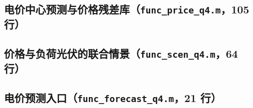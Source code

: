 \subsection{电价中心预测与价格残差库（\texttt{func_price_q4.m}，105 行）}

\subsection{价格与负荷光伏的联合情景（\texttt{func_scen_q4.m}，64 行）}

\subsection{电价预测入口（\texttt{func_forecast_q4.m}，21 行）}
